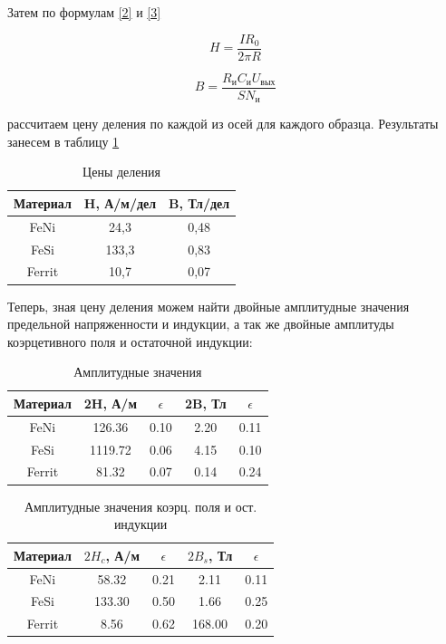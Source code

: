 \documentclass[a4paper, 12pt]{article}
\begin{document}
Затем по формулам \ref{2} и \ref{3}

\begin{equation}\label{2}
	H = \frac{IR_0}{2 \pi R}
\end{equation}

\begin{equation}\label{3}
	B = \frac{R_\text{и} C_\text{и} U_\text{вых}}{S N_\text{и}}
\end{equation}

рассчитаем цену деления по каждой из осей для каждого образца. Результаты занесем в таблицу \ref{tab:tsena_deleniya}

\begin{table}[H]
	\centering
	\begin{tabular}{|c|c|c|}
	\hline
	Материал & H, А/м/дел & B, Тл/дел \\ \hline
	FeNi     & 24,3       & 0,48      \\ \hline
	FeSi     & 133,3      & 0,83      \\ \hline
	Ferrit   & 10,7       & 0,07      \\ \hline
	\end{tabular}
	\caption{Цены деления}
	\label{tab:tsena_deleniya}
	\end{table}

Теперь, зная цену деления можем найти двойные амплитудные значения предельной напряженности и индукции, 
а так же двойные амплитуды коэрцетивного поля и остаточной индукции:

\begin{table}[H]
	\centering
	\begin{tabular}{|c|c|c|c|c|}
	\hline
	Материал & 2H, А/м       & $\epsilon$ & 2B, Тл      & $\epsilon$ \\ \hline
	FeNi     & 126.36  & 0.10    & 2.20 & 0.11    \\ \hline
	FeSi     & 1119.72 & 0.06    & 4.15    & 0.10    \\ \hline
	Ferrit   & 81.32   & 0.07    & 0.14    & 0.24    \\ \hline
	\end{tabular}
	\caption{Амплитудные значения}
	\label{tab:amplitudi}
\end{table}

\begin{table}[H]
	\centering
	\begin{tabular}{|c|c|c|c|c|}
	\hline
	Материал & $2H_c$, А/м  & $\epsilon$ & $2B_s$, Тл   & $\epsilon$ \\ \hline
	FeNi     & 58.32  & 0.21       & 2.11 & 0.11       \\ \hline
	FeSi     & 133.30 & 0.50       & 1.66    & 0.25       \\ \hline
	Ferrit   & 8.56   & 0.62       & 168.00  & 0.20       \\ \hline
	\end{tabular}
	\caption{Амплитудные значения коэрц. поля и ост. индукции}
	\label{tab:koerc}
\end{table}
\end{document}
